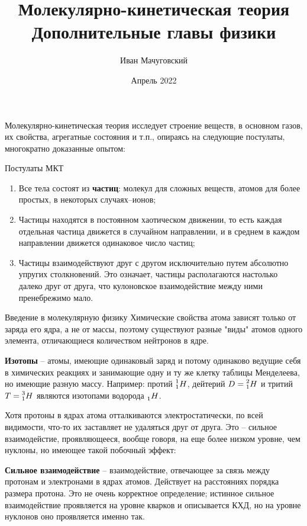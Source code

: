 \documentclass{article}
\title{Молекулярно-кинетическая теория \\ \large Дополнительные главы физики}
\date{Апрель 2022}
\author{Иван Мачуговский}
\newcommand{\definition}[2]{\begin{samepage} \textbf{#1} -- #2. \end{samepage} \par}
\begin{document}
	\maketitle

	Молекулярно-кинетическая теория исследует строение веществ, в основном газов, их свойства, агрегатные состояния и т.п., опираясь на следующие постулаты, многократно доказанные опытом:

	\begin{section}{Постулаты МКТ}
		\begin{enumerate}
			\item Все тела состоят из \textbf{частиц}: молекул для сложных веществ, атомов для более простых, в некоторых случаях--ионов;

			\item Частицы находятся в постоянном хаотическом движении, то есть каждая отдельная частица движется в случайном направлении, и в среднем в каждом направлении движется одинаковое число частиц;

			\item Частицы взаимодействуют друг с другом исключительно путем абсолютно упругих столкновений. Это означает, частицы располагаются настолько далеко друг от друга, что кулоновское взаимодействие между ними пренебрежимо мало.
		\end{enumerate}
	\end{section}


	\begin{section}{Введение в молекулярную физику}
		Химические свойства атома зависят только от заряда его ядра, а не от массы, поэтому существуют разные "виды" атомов одного элемента, отличающиеся количеством нейтронов в ядре.

		\definition{Изотопы}{атомы, имеющие одинаковый заряд и потому одинаково ведущие себя в химических реакциях и занимающие одну и ту же клетку таблицы Менделеева, но имеющие разную массу. Например: протий $\prescript{1}{1}{H}$, дейтерий $D = \prescript{2}{1}{H}$ и тритий $T = \prescript{3}{1}{H}$ являются изотопами водорода $\prescript{}{1}{H}$}

		Хотя протоны в ядрах атома отталкиваются электростатически, по всей видимости, что-то их заставляет не удаляться друг от друга. Это -- сильное взаимодейстие, проявляющееся, вообще говоря, на еще более низком уровне, чем нуклоны, но имеющее такой побочный эффект:

		\definition{Сильное взаимодействие}{взаимодействие, отвечающее за связь между протонам и электронами в ядрах атомов. Действует на расстояниях порядка размера протона. Это не очень корректное определение; истинное сильное взаимодействие проявляется на уровне кварков и описывается КХД, но на уровне нуклонов оно проявляется именно так}
	\end{section}
\end{document}
